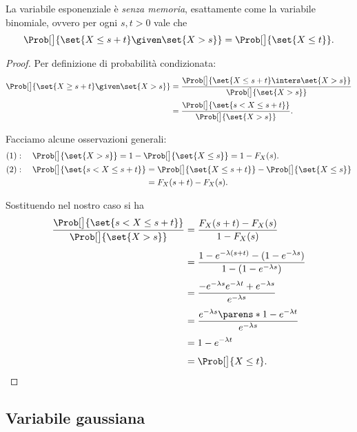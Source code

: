 La variabile esponenziale è \emph{senza memoria}, esattamente come la variabile binomiale, ovvero per ogni $s, t > 0$ vale che \[
    \Prob[\big]{\set{X \leq s + t} \given \set{X > s}} = \Prob[\big]{\set{X \leq t}}.    
\]
\begin{proof}
    Per definizione di probabilità condizionata:
    \begin{align*}
        \Prob[\big]{\set{X \geq s + t} \given \set{X > s}}
        &= \frac{\Prob[\big]{\set{X \leq s + t} \inters \set{X > s}}}{\Prob[\big]{\set{X > s}}}\\
        &= \frac{\Prob[\big]{\set{s < X \leq s + t}}}{\Prob[\big]{\set{X > s}}}.
    \end{align*}

    Facciamo alcune osservazioni generali:
    \begin{alignat*}{2}
        &(1):\; &&\Prob[\big]{\set{X > s}} = 1 - \Prob[\big]{\set{X \leq s}} = 1 - F_X(s).\\
        &(2):\; &&\begin{alignedat}[t]{1}
                \Prob[\big]{\set{s < X \leq s + t}} 
                &= \Prob[\big]{\set{X \leq s + t}} - \Prob[\big]{\set{X \leq s}} \\
                &= F_X(s+t) - F_X(s).
            \end{alignedat}
    \end{alignat*}

    Sostituendo nel nostro caso si ha \begin{align*}
        \frac{\Prob[\big]{\set{s < X \leq s + t}}}{\Prob[\big]{\set{X > s}}}
        &= \frac{F_X(s+t) - F_X(s)}{1 - F_X(s)}\\[3pt]
        &= \frac{1 - e^{-\lambda (s+t)} - (1 - e^{-\lambda s})}{1 - (1 - e^{-\lambda s})}\\[3pt]
        &= \frac{-e^{-\lambda s}e^{-\lambda t} + e^{-\lambda s}}{e^{-\lambda s}}\\[3pt]
        &= \frac{e^{-\lambda s}\parens*{1 - e^{-\lambda t}}}{e^{-\lambda s}}\\[3pt]
        &= 1 - e^{-\lambda t}\\[3pt]
        &= \Prob[\big]{X \leq t}. \qedhere
    \end{align*}
\end{proof}

\subsection{Variabile gaussiana}

